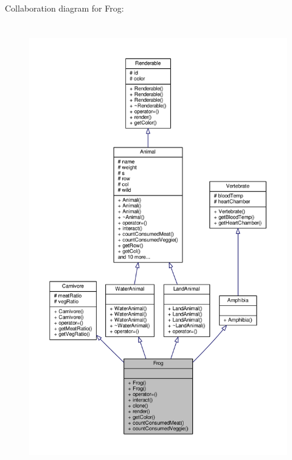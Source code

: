 Collaboration diagram for Frog\+:
\nopagebreak
\begin{figure}[H]
\begin{center}
\leavevmode
\includegraphics[height=550pt]{classFrog__coll__graph}
\end{center}
\end{figure}
